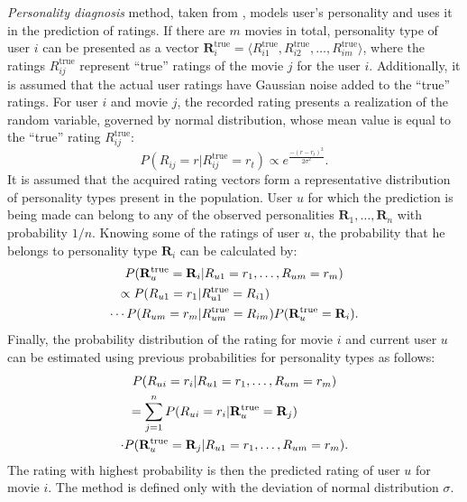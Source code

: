\documentclass[conference,a4paper]{IEEEtran}
\begin{document}
\emph{Personality diagnosis} method, taken from \cite{pennock2000collaborative},
models user's personality and uses it in the prediction of ratings. If there are
$m$ movies in total, personality type of user $i$ can be presented as a vector
$\mathbf{R}^\mathrm{true}_i = \langle R^\mathrm{true}_{i1}, R^\mathrm{true}_{i2},
\dots, R^\mathrm{true}_{im} \rangle$, where the ratings $R^\mathrm{true}_{ij}$
represent ``true'' ratings of the movie $j$ for the user $i$. Additionally, it is
assumed that the actual user ratings have Gaussian noise added to the ``true''
ratings. For user $i$ and movie $j$, the recorded rating presents a realization
of the random variable, governed by normal distribution, whose mean value is
equal to the ``true'' rating $R^\mathrm{true}_{ij}$:
\[
P(R_{ij} = r | R_{ij}^\mathrm{true} = r_t) \propto e^\frac{-(r - r_t) ^
2}{2 \sigma^2}.
\]
It is assumed that the acquired rating vectors form a representative distribution
of personality types present in the population. User $u$ for which the prediction
is being made can belong to any of the observed personalities $\mathbf{R}_1,
\dots, \mathbf{R}_n$ with probability $1 / n$. Knowing some of the ratings of
user $u$, the probability that he belongs to personality type $\mathbf{R}_i$ can
be calculated by:
\begin{multline*}
P(\mathbf{R}_u^\mathrm{true} = \mathbf{R}_i | R_{u1} = r_1, \dots,
R_{um} = r_m) \\
\shoveleft{\propto P(R_{u1} = r_1 | R_{u1}^\mathrm{true} = R_{i1})} \\
\cdots P(R_{um} = r_m | R_{um}^\mathrm{true} = R_{im})
P(\mathbf{R}_u^\mathrm{true} = \mathbf{R}_i).
\end{multline*}
Finally, the probability distribution of the rating for movie $i$ and current
user $u$ can be estimated using previous probabilities for personality types as
follows:
\begin{multline}
P(R_{ui} = r_i | R_{u1} = r_1, \dots, R_{um} = r_m) \\
\shoveleft{= \sum\limits_{j = 1}^{n} P(R_{ui} = r_i |
\mathbf{R}_u^\mathrm{true} = \mathbf{R}_j)} \\
\cdot P(\mathbf{R}_u^\mathrm{true} = \mathbf{R}_j | R_{u1} = r_1, \dots,
R_{um} = r_m).
\end{multline}
The rating with highest probability is then the predicted rating of user $u$ for
movie $i$. The method is defined only with the deviation of normal
distribution $\sigma$.
\end{document}
